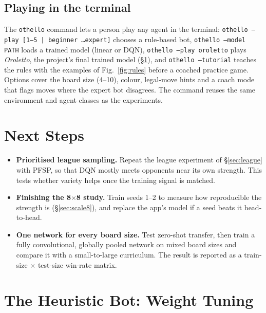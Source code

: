 \documentclass[11pt]{article}
\newcommand{\bx}[1]{#1$\times$#1}
\begin{document}
\subsection{Playing in the terminal}
\label{sec:cli}
The \texttt{othello} command lets a person play any agent in the terminal:
\texttt{othello --play [1--5 | beginner \dots expert]} chooses a rule-based bot,
\texttt{othello --model PATH} loads a trained model (linear or DQN),
\texttt{othello --play oroletto} plays \textit{Oroletto}, the project's final
trained model (\S\ref{sec:next}), and
\texttt{othello --tutorial} teaches the rules with the examples of
Fig.~\ref{fig:rules} before a coached practice game. Options cover the board size
(4--10), colour, legal-move hints and a coach mode that flags moves where the
expert bot disagrees. The command reuses the same environment and agent classes as
the experiments.

\section{Next Steps}
\label{sec:next}

\begin{itemize}[leftmargin=*]
  \item \textbf{Prioritised league sampling.} Repeat the league experiment of
        \S\ref{sec:league} with PFSP, so that DQN mostly meets opponents near
        its own strength. This tests whether variety helps once the training
        signal is matched.
  \item \textbf{Finishing the \bx{8} study.} Train seeds 1--2 to measure how
        reproducible the strength is (\S\ref{sec:scale8}), and replace the
        app's model if a seed beats it head-to-head.
  \item \textbf{One network for every board size.} Test zero-shot transfer,
        then train a fully convolutional, globally pooled network on mixed
        board sizes and compare it with a small-to-large curriculum. The result
        is reported as a train-size $\times$ test-size win-rate matrix.
\end{itemize}

\clearpage
\appendix
\setcounter{table}{0}
\setcounter{figure}{0}
\section{The Heuristic Bot: Weight Tuning}
\label{app:heuristic}
\end{document}
